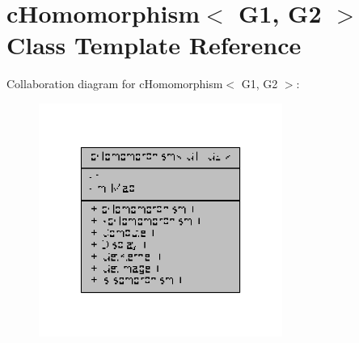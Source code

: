 \hypertarget{classcHomomorphism}{\section{c\-Homomorphism$<$ G1, G2 $>$ Class Template Reference}
\label{classcHomomorphism}
}


Collaboration diagram for c\-Homomorphism$<$ G1, G2 $>$\-:
\nopagebreak
\begin{figure}[H]
\begin{center}
\leavevmode
\includegraphics[width=226pt]{classcHomomorphism__coll__graph}
\end{center}
\end{figure}
